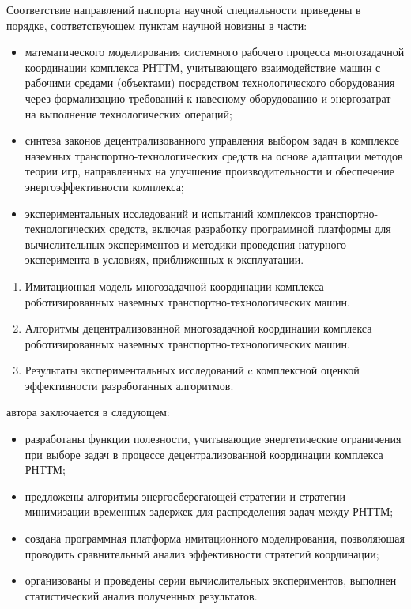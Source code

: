 Соответствие направлений паспорта научной специальности приведены в порядке, соответствующем пунктам научной новизны в части:
\begin{itemize}[beginpenalty=10000, midpenalty=10000, wide=\parindent, leftmargin=0pt]
    \item математического моделирования системного рабочего процесса многозадачной координации комплекса РНТТМ, учитывающего взаимодействие машин с рабочими средами (объектами) посредством технологического оборудования через формализацию требований к навесному оборудованию и энергозатрат на выполнение технологических операций;
    \item синтеза законов децентрализованного управления выбором задач в комплексе наземных транспортно-технологических средств на основе адаптации методов теории игр, направленных на улучшение производительности и обеспечение энергоэффективности комплекса;
    \item экспериментальных исследований и испытаний комплексов транспортно-технологических средств, включая разработку программной платформы для вычислительных экспериментов и методики проведения натурного эксперимента в условиях, приближенных к эксплуатации.
\end{itemize}

{}
\begin{enumerate}[beginpenalty=10000, midpenalty=10000, wide=\parindent, leftmargin=0pt]
	\item Имитационная модель многозадачной координации комплекса роботизированных наземных транспортно-технологических машин.
	\item Алгоритмы децентрализованной многозадачной координации комплекса роботизированных наземных транспортно-технологических машин.
	\item Результаты экспериментальных исследований c комплексной оценкой эффективности разработанных алгоритмов.
\end{enumerate}

{\contribution} автора заключается в следующем:
\begin{itemize}[beginpenalty=10000, midpenalty=10000, wide=\parindent, leftmargin=0pt]
    \item разработаны функции полезности, учитывающие энергетические ограничения при выборе задач в процессе децентрализованной координации комплекса РНТТМ;
    \item предложены алгоритмы энергосберегающей стратегии и стратегии минимизации временных задержек для распределения задач между РНТТМ;
    \item создана программная платформа имитационного моделирования, позволяющая проводить сравнительный анализ эффективности стратегий координации;
    \item организованы и проведены серии вычислительных экспериментов, выполнен статистический анализ полученных результатов.
\end{itemize}

